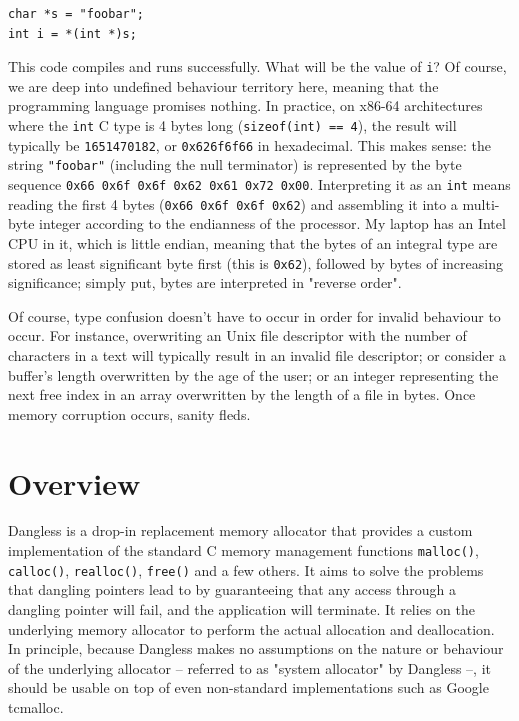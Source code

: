 \begin{lstlisting}
char *s = "foobar";
int i = *(int *)s;
\end{lstlisting}

This code compiles and runs successfully. What will be the value of \lstinline!i!? Of course, we are deep into undefined behaviour territory here, meaning that the programming language promises nothing. In practice, on x86-64 architectures where the \lstinline!int! C type is 4 bytes long (\lstinline!sizeof(int) == 4!), the result will typically be \texttt{1651470182}, or \texttt{0x626f6f66} in hexadecimal. This makes sense: the string \lstinline!"foobar"! (including the null terminator) is represented by the byte sequence \texttt{0x66 0x6f 0x6f 0x62 0x61 0x72 0x00}. Interpreting it as an \lstinline!int! means reading the first 4 bytes (\texttt{0x66 0x6f 0x6f 0x62}) and assembling it into a multi-byte integer according to the endianness of the processor. My laptop has an Intel CPU in it, which is little endian, meaning that the bytes of an integral type are stored as least significant byte first (this is \texttt{0x62}), followed by bytes of increasing significance; simply put, bytes are interpreted in "reverse order".

Of course, type confusion doesn't have to occur in order for invalid behaviour to occur. For instance, overwriting an Unix file descriptor with the number of characters in a text will typically result in an invalid file descriptor; or consider a buffer's length overwritten by the age of the user; or an integer representing the next free index in an array overwritten by the length of a file in bytes. Once memory corruption occurs, sanity fleds.

\section{Overview}

Dangless is a drop-in replacement memory allocator that provides a custom implementation of the standard C memory management functions \lstinline!malloc()!, \lstinline!calloc()!, \lstinline!realloc()!, \lstinline!free()! and a few others. It aims to solve the problems that dangling pointers lead to by guaranteeing that any access through a dangling pointer will fail, and the application will terminate. It relies on the underlying memory allocator to perform the actual allocation and deallocation. In principle, because Dangless makes no assumptions on the nature or behaviour of the underlying allocator -- referred to as "system allocator" by Dangless --, it should be usable on top of even non-standard implementations such as Google tcmalloc.

